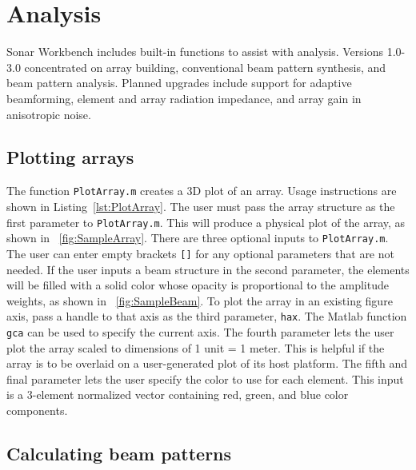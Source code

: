 \chapter{Analysis}\label{ch:analysis}

Sonar Workbench includes built-in functions to assist with analysis.  Versions 1.0-3.0 concentrated on array building, conventional beam pattern synthesis, and beam pattern analysis.  Planned upgrades include support for adaptive beamforming, element and array radiation impedance, and array gain in anisotropic noise.

\section{Plotting arrays}

The function \texttt{PlotArray.m} creates a 3D plot of an array. Usage instructions are shown in Listing~\ref{lst:PlotArray}. The user must pass the array structure as the first parameter to \texttt{PlotArray.m}. This will produce a physical plot of the array, as shown in \figname~\ref{fig:SampleArray}. There are three optional inputs to \texttt{PlotArray.m}. The user can enter empty brackets \texttt{[]} for any optional parameters that are not needed. If the user inputs a beam structure in the second parameter, the elements will be filled with a solid color whose opacity is proportional to the amplitude weights, as shown in \figname~\ref{fig:SampleBeam}. To plot the array in an existing figure axis, pass a handle to that axis as the third parameter, \texttt{hax}. The Matlab function \texttt{gca} can be used to specify the current axis. The fourth parameter lets the user plot the array scaled to dimensions of 1 unit = 1 meter. This is helpful if the array is to be overlaid on a user-generated plot of its host platform. The fifth and final parameter lets the user specify the color to use for each element. This input is a 3-element normalized vector containing red, green, and blue color components.

\newpage

 
\section{Calculating beam patterns}

